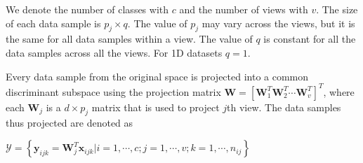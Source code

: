 We denote the number of classes with $c$ and the number of views with $v$. The size of each data sample is $p_j \times q$. The value of $p_j$ may vary across the views, but it is the same for all data samples within a view. The value of $q$ is constant for all the data samples across all the views. For 1D datasets $q=1$.

Every data sample from the original space is projected into a common discriminant subspace using the projection matrix $\textbf{W} = \left[ \textbf{W}_1^T \textbf{W}_2^T \cdots \textbf{W}_v^T \right]^T $, where each $\textbf{W}_j$ is a $d \times p_j$ matrix that is used to project $j$th view. The data samples thus projected are denoted as

\begin{center}
$\mathcal{Y} = \left \{ \textbf{y}_{ijk} = \textbf{W}_j^T \textbf{x}_{ijk} | i=1,\cdots,c; j=1,\cdots,v; k=1,\cdots,n_{ij} \right \}$
\end{center}


